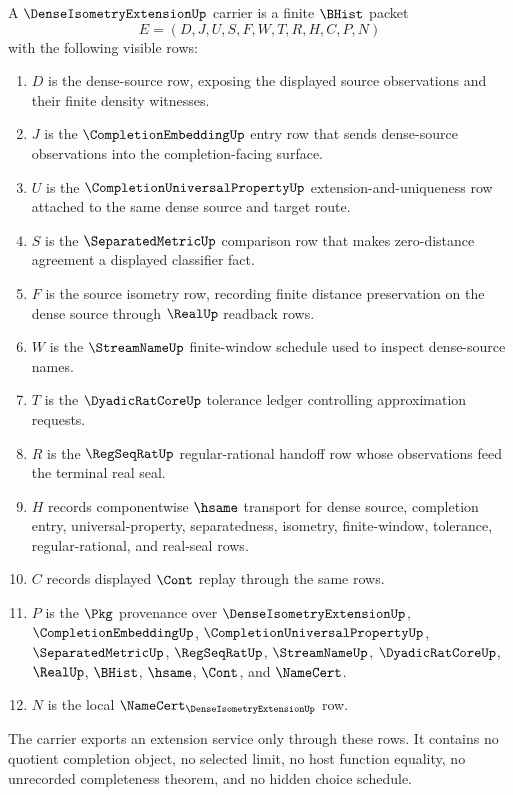 \begin{definition}
\label{def:dense-isometry-extension-carrier}
A $\DenseIsometryExtensionUp$ carrier is a finite $\BHist$ packet
$$
E=(D,J,U,S,F,W,T,R,H,C,P,N)
$$
with the following visible rows:
\begin{enumerate}
\item $D$ is the dense-source row, exposing the displayed source observations and their finite density witnesses.
\item $J$ is the $\CompletionEmbeddingUp$ entry row that sends dense-source observations into the completion-facing surface.
\item $U$ is the $\CompletionUniversalPropertyUp$ extension-and-uniqueness row attached to the same dense source and target route.
\item $S$ is the $\SeparatedMetricUp$ comparison row that makes zero-distance agreement a displayed classifier fact.
\item $F$ is the source isometry row, recording finite distance preservation on the dense source through $\RealUp$ readback rows.
\item $W$ is the $\StreamNameUp$ finite-window schedule used to inspect dense-source names.
\item $T$ is the $\DyadicRatCoreUp$ tolerance ledger controlling approximation requests.
\item $R$ is the $\RegSeqRatUp$ regular-rational handoff row whose observations feed the terminal real seal.
\item $H$ records componentwise $\hsame$ transport for dense source, completion entry, universal-property, separatedness, isometry, finite-window, tolerance, regular-rational, and real-seal rows.
\item $C$ records displayed $\Cont$ replay through the same rows.
\item $P$ is the $\Pkg$ provenance over $\DenseIsometryExtensionUp$, $\CompletionEmbeddingUp$, $\CompletionUniversalPropertyUp$, $\SeparatedMetricUp$, $\RegSeqRatUp$, $\StreamNameUp$, $\DyadicRatCoreUp$, $\RealUp$, $\BHist$, $\hsame$, $\Cont$, and $\NameCert$.
\item $N$ is the local $\NameCert_{\DenseIsometryExtensionUp}$ row.
\end{enumerate}
The carrier exports an extension service only through these rows. It contains no quotient completion object, no selected limit, no host function equality, no unrecorded completeness theorem, and no hidden choice schedule.
\end{definition}

